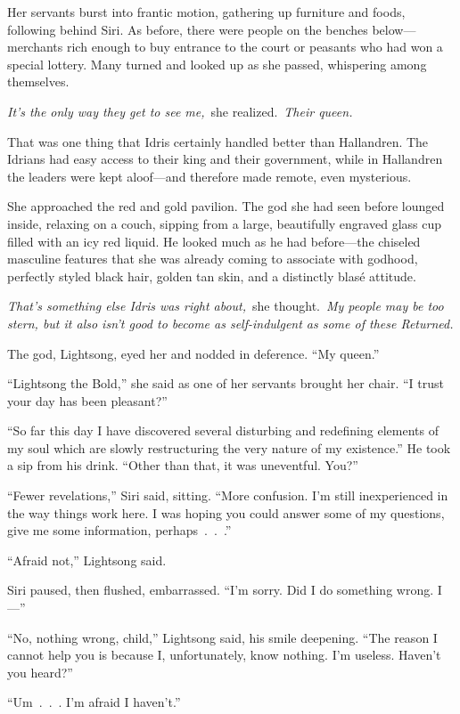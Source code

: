 Her servants burst into frantic motion, gathering up furniture and foods, following behind Siri. As before, there were people on the benches below—merchants rich enough to buy entrance to the court or peasants who had won a special lottery. Many turned and looked up as she passed, whispering among themselves.

\textit{It’s the only way they get to see me,}~she realized.~\textit{Their queen.}

That was one thing that Idris certainly handled better than Hallandren. The Idrians had easy access to their king and their government, while in Hallandren the leaders were kept aloof—and therefore made remote, even mysterious.

She approached the red and gold pavilion. The god she had seen before lounged inside, relaxing on a couch, sipping from a large, beautifully engraved glass cup filled with an icy red liquid. He looked much as he had before—the chiseled masculine features that she was already coming to associate with godhood, perfectly styled black hair, golden tan skin, and a distinctly blasé attitude.

\textit{That’s something else Idris was right about,}~she thought.~\textit{My people may be too stern, but it also isn’t good to become as self-indulgent as some of these Returned.}

The god, Lightsong, eyed her and nodded in deference. “My queen.”

“Lightsong the Bold,” she said as one of her servants brought her chair. “I trust your day has been pleasant?”

“So far this day I have discovered several disturbing and redefining elements of my soul which are slowly restructuring the very nature of my existence.” He took a sip from his drink. “Other than that, it was uneventful. You?”

“Fewer revelations,” Siri said, sitting. “More confusion. I’m still inexperienced in the way things work here. I was hoping you could answer some of my questions, give me some information, perhaps~.~.~.”

“Afraid not,” Lightsong said.

Siri paused, then flushed, embarrassed. “I’m sorry. Did I do something wrong. I—”

“No, nothing wrong, child,” Lightsong said, his smile deepening. “The reason I cannot help you is because I, unfortunately, know nothing. I’m useless. Haven’t you heard?”

“Um~.~.~. I’m afraid I haven’t.”

